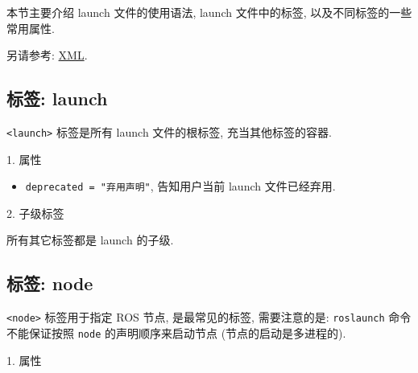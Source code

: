 \documentclass[openany, fontset=windowsold]{ctexbook}
\theoremstyle{kaiti}
\theoremstyle{normal}
\begin{document}
本节主要介绍 launch 文件的使用语法, launch 文件中的标签, 以及不同标签的一些常用属性.

另请参考: \href{http://wiki.ros.org/roslaunch/XML}{XML}.

\subsection{标签: launch}

\verb|<launch>| 标签是所有 launch 文件的根标签, 充当其他标签的容器.

1. 属性

\begin{itemize}
  \item \verb|deprecated = "弃用声明"|, 告知用户当前 launch 文件已经弃用.
\end{itemize}

2. 子级标签

所有其它标签都是 launch 的子级.

\subsection{标签: node}

\verb|<node>| 标签用于指定 ROS 节点, 是最常见的标签, 需要注意的是: \verb|roslaunch| 命令不能保证按照 \verb|node| 的声明顺序来启动节点 (节点的启动是多进程的).

1. 属性
\end{document}
